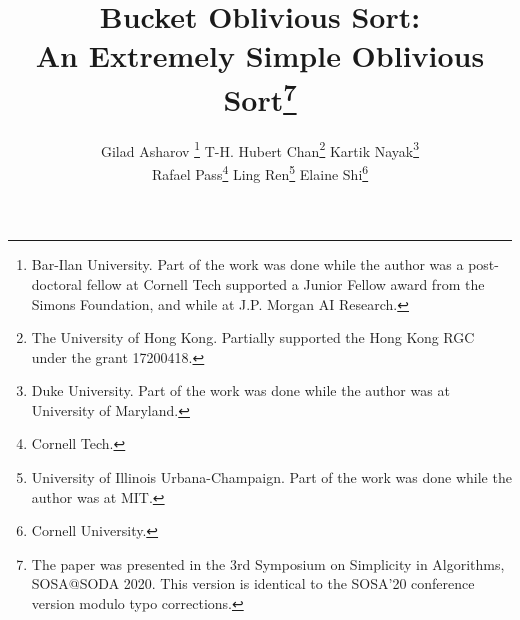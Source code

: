 \documentclass[11pt,letterpaper]{article}
\theoremstyle{boxes}
\begin{document}
\title{\bf Bucket Oblivious Sort: \\An Extremely Simple Oblivious Sort\thanks{The paper was presented in the 3rd Symposium on Simplicity in Algorithms, SOSA@SODA 2020. This version is identical
to the SOSA'20 conference version modulo typo corrections.
}}

\author{Gilad Asharov \thanks{Bar-Ilan University. Part of the work was done while the author was a post-doctoral fellow at Cornell Tech supported a Junior Fellow award from the Simons Foundation, and while at J.P. Morgan AI Research.} \qquad
T-H. Hubert Chan\thanks{The University of Hong Kong. Partially supported the Hong Kong RGC under the grant 17200418.} \qquad
Kartik Nayak\thanks{Duke University. Part of the work was done while the author was at University of Maryland.} \\
Rafael Pass\thanks{Cornell Tech.} \qquad
Ling Ren\thanks{University of Illinois Urbana-Champaign. Part of the work was done while the author was at MIT.} \qquad
Elaine Shi\thanks{Cornell University.}}

\newcommand{\rl}[1]{{\footnotesize\color{orange}[Ling: #1]}}

\date{}

\maketitle


\begin{abstract}

\end{abstract}






%
%



\appendix

%
\end{document}
